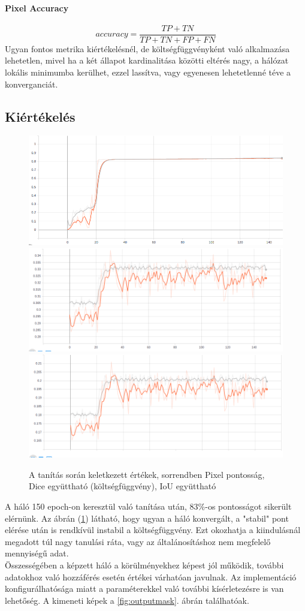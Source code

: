 \documentclass[a4paper]{article}
\begin{document}
	\paragraph{Pixel Accuracy}
		\begin{equation}
	accuracy= \frac{TP+TN}{TP+TN+FP+FN}
	\end{equation}
	Ugyan fontos metrika kiértékelésnél, de költségfüggvényként való alkalmazása lehetetlen, mivel ha a két állapot kardinalitása közötti eltérés nagy, a hálózat lokális minimumba kerülhet, ezzel lassítva, vagy egyenesen lehetetlenné téve a konverganciát.
	\subsection{Kiértékelés}
\begin{figure}[!ht]
	\centering
	\includegraphics[width=0.35\linewidth]{figures/VNETAccuracy}
	\includegraphics[width=0.35\linewidth]{figures/VNETDiceCoeff}
	\includegraphics[width=0.35\linewidth]{figures/VNETIoUCoeff}
	\caption{A tanítás során keletkezett értékek, sorrendben Pixel pontosság, Dice együttható (költségfüggvény), IoU együttható}
	\label{fig:vnet}
\end{figure}
	A háló 150 epoch-on keresztül való tanítása után, 83\%-os pontosságot sikerült elérnünk.
Az ábrán (\ref{fig:vnet}) látható, hogy ugyan a háló konvergált, a "stabil" pont elérése után is rendkívül instabil a költségfüggvény. Ezt okozhatja a kiindulásnál megadott túl nagy tanulási ráta, vagy az általánosításhoz nem megfelelő mennyiségű adat.
\\[1em]
Összességében a képzett háló a körülményekhez képest jól működik, további adatokhoz való hozzáférés esetén értékei várhatóan javulnak. Az implementáció konfigurálhatósága miatt a paraméterekkel való további kísérletezésre is van lehetőség.
A kimeneti képek a \ref{fig:outputmask}. ábrán találhatóak.
\end{document}

